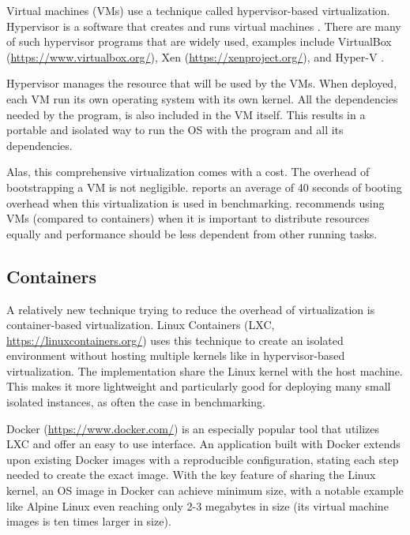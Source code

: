 Virtual machines (VMs) use a technique called hypervisor-based virtualization.
Hypervisor is a software that creates and runs virtual machines \citep{scheepersVirtualizationContainerizationApplication2014}.
There are many of such hypervisor programs that are widely used, examples include VirtualBox (\url{https://www.virtualbox.org/}), Xen (\url{https://xenproject.org/}), and Hyper-V \citep{scooleyIntroductionHyperVWindows}.

Hypervisor manages the resource that will be used by the VMs.
When deployed, each VM run its own operating system with its own kernel.
All the dependencies needed by the program, is also included in the VM itself.
This results in a portable and isolated way to run the OS with the program and all its dependencies.

Alas, this comprehensive virtualization comes with a cost.
The overhead of bootstrapping a VM is not negligible.
\citet{kordonBenchKitToolMassive2014} reports an average of 40 seconds of booting overhead when this virtualization is used in benchmarking.
\citet{scheepersVirtualizationContainerizationApplication2014} recommends using VMs (compared to containers) when it is important to distribute resources equally and performance should be less dependent from other running tasks.

\subsection{Containers}

A relatively new technique trying to reduce the overhead of virtualization is container-based virtualization.
Linux Containers (LXC, \url{https://linuxcontainers.org/}) uses this technique to create an isolated environment without hosting multiple kernels like in hypervisor-based virtualization.
The implementation share the Linux kernel with the host machine.
This makes it more lightweight and particularly good for deploying many small isolated instances, as often the case in benchmarking.

Docker (\url{https://www.docker.com/}) is an especially popular tool that utilizes LXC and offer an easy to use interface.
An application built with Docker extends upon existing Docker images with a reproducible  configuration, stating each step needed to create the exact image.
With the key feature of sharing the Linux kernel, an OS image in Docker can achieve minimum size, with a notable example like Alpine Linux even reaching only 2-3 megabytes in size (its virtual machine images is ten times larger in size).


